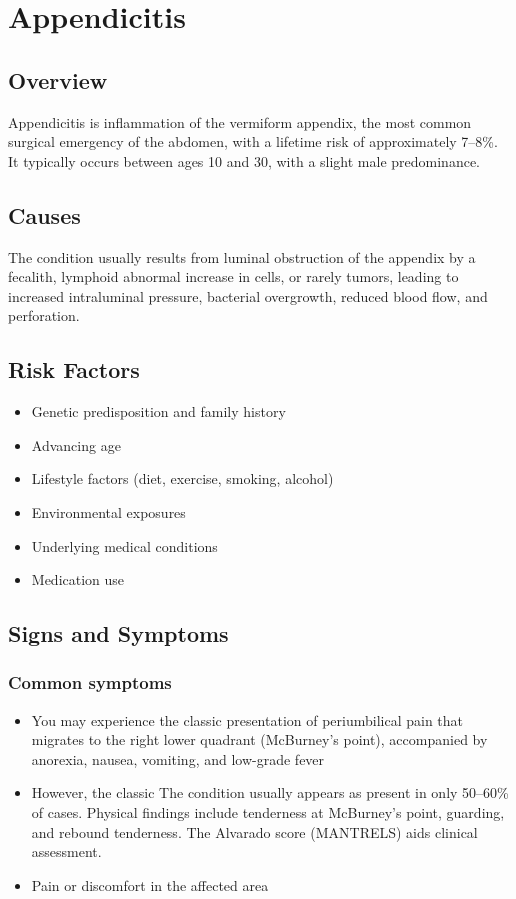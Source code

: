 \chapter{Appendicitis}
\label{sec:Appendicitis}

\section{Overview}
Appendicitis is inflammation of the vermiform appendix, the most common surgical emergency of the abdomen, with a lifetime risk of approximately 7--8\%. It typically occurs between ages 10 and 30, with a slight male predominance.
\section{Causes}
The condition usually results from luminal obstruction of the appendix by a fecalith, lymphoid abnormal increase in cells, or rarely tumors, leading to increased intraluminal pressure, bacterial overgrowth, reduced blood flow, and perforation.     
\section{Risk Factors}

\begin{itemize}[noitemsep]
  \item Genetic predisposition and family history
  \item Advancing age
  \item Lifestyle factors (diet, exercise, smoking, alcohol)
  \item Environmental exposures
  \item Underlying medical conditions
  \item Medication use
\end{itemize}
\section{Signs and Symptoms}

\subsection{Common symptoms}
\begin{itemize}[noitemsep]
  \item You may experience the classic presentation of periumbilical pain that migrates to the right lower quadrant (McBurney's point), accompanied by anorexia, nausea, vomiting, and low-grade fever
  \item However, the classic The condition usually appears as present in only 50--60\% of cases. Physical findings include tenderness at McBurney's point, guarding, and rebound tenderness. The Alvarado score (MANTRELS) aids clinical assessment.
  \item Pain or discomfort in the affected area
  \end{itemize}

